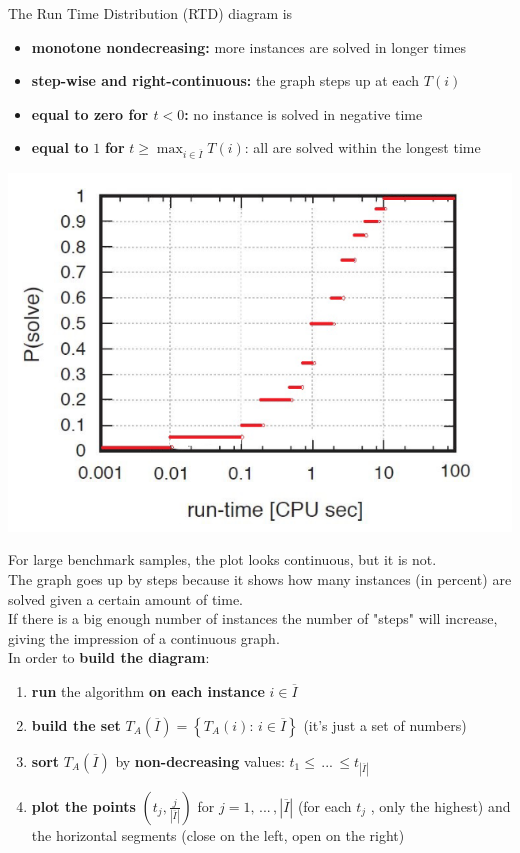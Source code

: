 \documentclass[11pt]{article}
\begin{document}
	The Run Time Distribution (RTD) diagram is
	\begin{itemize}
		\item \textbf{monotone nondecreasing:} more instances are solved in longer times
		\item \textbf{step-wise and right-continuous:} the graph steps up at each $T (i )$
		\item \textbf{equal to zero for $t < 0$:} no instance is solved in negative time
		\item \textbf{equal to} $1$ \textbf{for} $t \geq \max_{i \in \overline{I}} T(i)$: all are solved within the longest time
	\end{itemize}
	\begin{center}
		\includegraphics[width=0.75\columnwidth]{img/RTD2}
	\end{center}
	For large benchmark samples, the plot looks continuous, but it is not.\\
	
	The graph goes up by steps because it shows how many instances (in percent) are solved given a certain amount of time. \\
	If there is a big enough number of instances the number of "steps" will increase, giving the impression of a continuous graph.\\
	
	In order to \textbf{build the diagram}:
	\begin{enumerate}
		\item \textbf{run} the algorithm \textbf{on each instance} $i \in \overline{I}$
		\item \textbf{build the set} $T_A (\overline{I}) = \left\{T_A (i): \, i \in \overline{I}\right\}$ (it's just a set of numbers)
		\item \textbf{sort} $T_A (\overline{I})$ by \textbf{non-decreasing} values: $t_1 \leq \, ... \, \leq  t_{|\overline{I}|}$
		\item \textbf{plot the points} $\left(t_j, \frac{j}{|\overline{I}|}\right)$ for $j = 1, \, ... \, , |\overline{I}|$ (for each $t_j$ , only the highest) and the horizontal segments (close on the left, open on the right)
	\end{enumerate}
	
\end{document}
